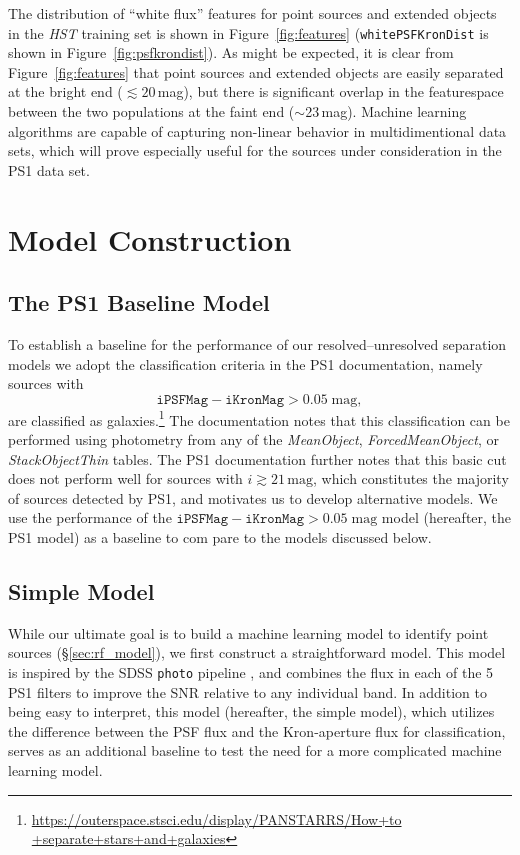 \documentclass[twocolumn]{aastex62}
\begin{document}
\begin{CJK*}{UTF8}{gbsn}
The distribution of ``white flux'' features for point sources and extended objects in the
\textit{HST} training set is shown in Figure~\ref{fig:features}
(\texttt{whitePSFKronDist} is shown in Figure~\ref{fig:psfkrondist}). As
might be expected, it is clear from Figure~\ref{fig:features} that point
sources and extended objects are easily separated at the bright end
($\lesssim 20$\,mag), but there is significant overlap in the featurespace
between the two populations at the faint end ($\sim$23\,mag). Machine
learning algorithms are capable of capturing non-linear behavior in
multidimentional data sets, which will prove especially useful for the
sources under consideration in the PS1 data set.

\section{Model Construction}
\subsection{The PS1 Baseline Model}\label{sec:ps1_model}

To establish a baseline for the performance of our resolved--unresolved
separation models we adopt the classification criteria in the PS1
documentation, namely sources with 
% 
$$ \mathtt{iPSFMag} - \mathtt{iKronMag}
> 0.05\;\mathrm{mag},$$ 
% 
are classified as
galaxies.\footnote{\url{https://outerspace.stsci.edu/display/PANSTARRS/How+to
 +separate+stars+and+galaxies}} The documentation notes that this
classification can be performed using photometry from any of the
\textit{MeanObject}, \textit{ForcedMeanObject}, or \textit{StackObjectThin}
tables. The PS1 documentation further notes that this basic cut does not
perform well for sources with $i \gtrsim 21\,\mathrm{mag}$, which
constitutes the majority of sources detected by PS1, and motivates us to
develop alternative models. We use the performance of the $\mathtt{iPSFMag}
- \mathtt{iKronMag} > 0.05\;\mathrm{mag}$ model (hereafter, the PS1 model)
as a baseline to com pare to the models discussed below.

\subsection{Simple Model}\label{sec:simple_model}

While our ultimate goal is to build a machine learning model to identify
point sources (\S\ref{sec:rf_model}), we first construct a straightforward
model. This model is inspired by the SDSS \texttt{photo} pipeline
\citep{Lupton01}, and combines the flux in each of the 5 PS1 filters to
improve the SNR relative to any individual band. In addition to being easy
to interpret, this model (hereafter, the simple model), which utilizes the
difference between the PSF flux and the Kron-aperture flux for
classification, serves as an additional baseline to test the need for a more
complicated machine learning model.


\end{CJK*}
\end{document}
